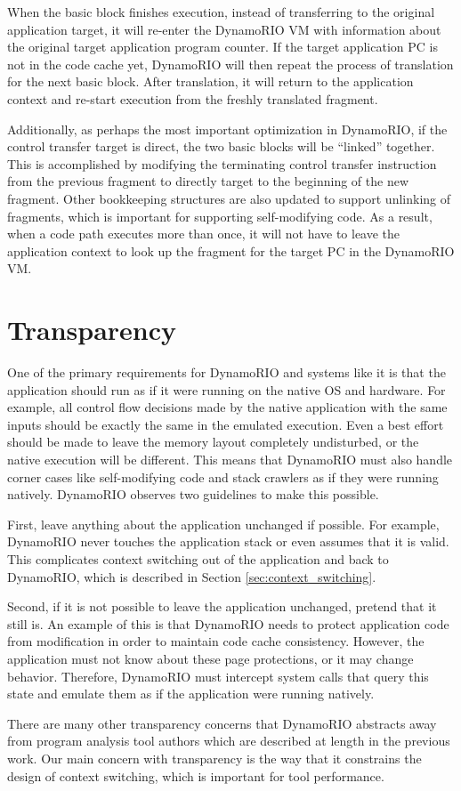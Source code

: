 When the basic block finishes execution, instead of transferring to the original
application target, it will re-enter the DynamoRIO VM with information about the
original target application program counter.  If the target application PC is
not in the code cache yet, DynamoRIO will then repeat the process of translation
for the next basic block.  After translation, it will return to the application
context and re-start execution from the freshly translated fragment.

Additionally, as perhaps the most important optimization in DynamoRIO, if the
control transfer target is direct, the two basic blocks will be ``linked''
together.  This is accomplished by modifying the terminating control transfer
instruction from the previous fragment to directly target to the beginning of
the new fragment.  Other bookkeeping structures are also updated to support
unlinking of fragments, which is important for supporting self-modifying code.
As a result, when a code path executes more than once, it will not have to leave
the application context to look up the fragment for the target PC in the
DynamoRIO VM.


\section{Transparency}
\label{sec:transparency}

One of the primary requirements for DynamoRIO and systems like it is that the
application should run as if it were running on the native OS and hardware.  For
example, all control flow decisions made by the native application with the same
inputs should be exactly the same in the emulated execution.  Even a best effort
should be made to leave the memory layout completely undisturbed, or the native
execution will be different.  This means that DynamoRIO must also handle corner
cases like self-modifying code and stack crawlers as if they were running
natively.  DynamoRIO observes two guidelines to make this possible.

First, leave anything about the application unchanged if possible.  For example,
DynamoRIO never touches the application stack or even assumes that it is valid.
This complicates context switching out of the application and back to DynamoRIO,
which is described in Section \ref{sec:context_switching}.

Second, if it is not possible to leave the application unchanged, pretend that
it still is.  An example of this is that DynamoRIO needs to protect application
code from modification in order to maintain code cache consistency.  However,
the application must not know about these page protections, or it may change
behavior.  Therefore, DynamoRIO must intercept system calls that query this
state and emulate them as if the application were running natively.

There are many other transparency concerns that DynamoRIO abstracts away from
program analysis tool authors which are described at length in the previous
work.  Our main concern with transparency is the way that it constrains the
design of context switching, which is important for tool performance.
